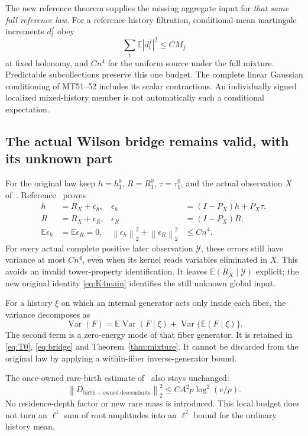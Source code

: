 \documentclass[11pt,letterpaper]{article}
\theoremstyle{remark}\newtheorem{remark}[theorem]{Remark}
\newcommand{\E}{\mathbb E}
\newcommand{\Var}{\operatorname{Var}}\newcommand{\Cov}{\operatorname{Cov}}
\newcommand{\norm}[1]{\left\lVert#1\right\rVert}
\begin{document}
The new reference theorem supplies the missing aggregate input for \emph{that same full reference law}. For a reference history filtration, conditional-mean martingale increments \(d_t^f\) obey
\[
 \sum_t\E|d_t^f|^2\le CM_f
\]
at fixed holonomy, and \(Cn^4\) for the uniform source under the full mixture. Predictable subcollections preserve this one budget. The complete linear Gaussian conditioning of MT51--52 includes its scalar contractions. An individually signed localized mixed-history member is not automatically such a conditional expectation.

\subsection{The actual Wilson bridge remains valid, with its unknown part}

For the original law keep \(h=h_1^0\), \(R=R_1^0\), \(\tau=\tau_1^0\), and the actual observation \(X\) of~\cite{SZ}. Reference~\cite[\S3.2]{RS} proves
\begin{align}\label{eq:bridge}
 h&=R_X+\epsilon_h,
 &\epsilon_h&=(I-P_X)h+P_X\tau,\\
 R&=R_X+\epsilon_R,
 &\epsilon_R&=(I-P_X)R,\nonumber\\
 \E\epsilon_h&=\E\epsilon_R=0,
 &\norm{\epsilon_h}_2^2+\norm{\epsilon_R}_2^2&\le Cn^4.\nonumber
\end{align}
For every actual complete positive later observation \(\mathcal Y\), these errors still have variance at most \(Cn^4\), even when its kernel reads variables eliminated in \(X\). This avoids an invalid tower-property identification. It leaves \(\E(R_X\mid\mathcal Y)\) explicit; the new original identity \eqref{eq:K4main} identifies the still unknown global input.

For a history \(\xi\) on which an internal generator acts only inside each fiber, the variance decomposes as
\[
 \Var(F)=\E\Var(F\mid\xi)+\Var\{\E(F\mid\xi)\}.
\]
The second term is a zero-energy mode of that fiber generator. It is retained in \eqref{eq:T0}, \eqref{eq:bridge} and Theorem~\ref{thm:mixture}. It cannot be discarded from the original law by applying a within-fiber inverse-generator bound.

The once-owned rare-birth estimate of~\cite[\S3]{RS} also stays unchanged:
\[
 \norm{D_{\mathrm{birth+owned\ descendants}}}_2^2
 \le CA^2p\log^2(e/p).
\]
No residence-depth factor or new rare mass is introduced. This local budget does not turn an \(\ell^1\) sum of root amplitudes into an \(\ell^2\) bound for the ordinary history mean.
\end{document}
